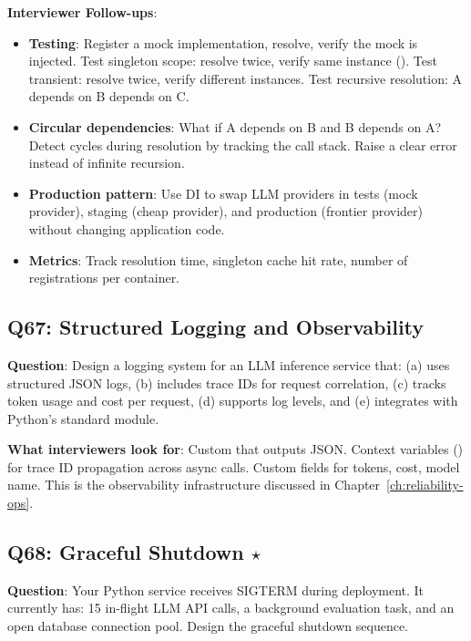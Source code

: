 \textbf{Interviewer Follow-ups}:
\begin{itemize}[leftmargin=*]
    \item \textbf{Testing}: Register a mock implementation, resolve, verify the mock is injected. Test singleton scope: resolve twice, verify same instance (). Test transient: resolve twice, verify different instances. Test recursive resolution: A depends on B depends on C.
    \item \textbf{Circular dependencies}: What if A depends on B and B depends on A? Detect cycles during resolution by tracking the call stack. Raise a clear error instead of infinite recursion.
    \item \textbf{Production pattern}: Use DI to swap LLM providers in tests (mock provider), staging (cheap provider), and production (frontier provider) without changing application code.
    \item \textbf{Metrics}: Track resolution time, singleton cache hit rate, number of registrations per container.
\end{itemize}

\subsection{Q67: Structured Logging and Observability}

\textbf{Question}: Design a logging system for an LLM inference service that: (a) uses structured JSON logs, (b) includes trace IDs for request correlation, (c) tracks token usage and cost per request, (d) supports log levels, and (e) integrates with Python's standard  module.

\textbf{What interviewers look for}: Custom  that outputs JSON. Context variables () for trace ID propagation across async calls. Custom  fields for tokens, cost, model name. This is the observability infrastructure discussed in Chapter~\ref{ch:reliability-ops}.

\subsection{Q68: Graceful Shutdown $\star$}

\textbf{Question}: Your Python service receives SIGTERM during deployment. It currently has: 15 in-flight LLM API calls, a background evaluation task, and an open database connection pool. Design the graceful shutdown sequence.

